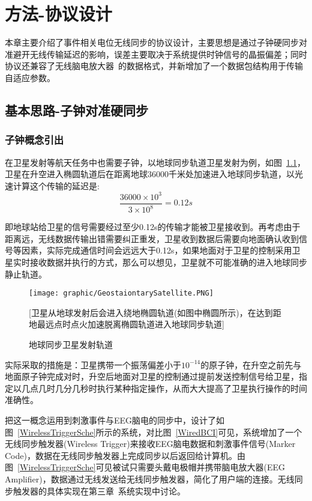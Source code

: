 \chapter{方法-协议设计\label{chp:protocol}}
本章主要介绍了事件相关电位无线同步的协议设计，主要思想是通过子钟硬同步对准避开无线传输延迟的影响，误差主要取决于系统提供时钟信号的晶振偏差；同时协议还兼容了无线脑电放大器~\cite{Xu2009}的数据格式，并新增加了一个数据包结构用于传输自适应参数。
\section{基本思路-子钟对准硬同步}
\subsection{子钟概念引出}
在卫星发射等航天任务中也需要子钟，以地球同步轨道卫星发射为例，如图~\ref{GeostationarySate}，卫星在升空进入椭圆轨道后在距离地球36000千米处加速进入地球同步轨道，以光速计算这个传输的延迟是:
\begin{equation}
\frac{36000 \times 10^{3}}{3 \times 10^{8}} = 0.12 s  
\end{equation}

即地球站给卫星的信号需要经过至少0.12s的传输才能被卫星接收到。再考虑由于距离远，无线数据传输出错需要纠正重发，卫星收到数据后需要向地面确认收到信号等因素，实际完成通信时间会远远大于0.12s，如果地面对于卫星的控制采用卫星实时接收数据并执行的方式，那么可以想见，卫星就不可能准确的进入地球同步静止轨道。

\begin{figure}[!hbp]
\begin{center}
\texttt{[image: graphic/GeostaiontarySatellite.PNG]}
\caption{ 地球同步卫星发射轨道 \label{GeostationarySate}}
[卫星从地球发射后会进入绕地椭圆轨道(如图中椭圆所示)，在达到距地最远点时点火加速脱离椭圆轨道进入地球同步轨道]
\end{center}
\end{figure}

实际采取的措施是：卫星携带一个振荡偏差小于$10^{-14}$的原子钟，在升空之前先与地面原子钟完成对时，升空后地面对卫星的控制通过提前发送控制信号给卫星，指定以几点几时几分几秒时执行某种指定操作，从而大大提高了卫星执行操作的时间准确性。

把这一概念运用到刺激事件与EEG脑电的同步中，设计了如图~\ref{WirelessTriggerSche}所示的系统，对比图~\ref{WiredBCI}可见，系统增加了一个无线同步触发器(Wireless Trigger)来接收EEG脑电数据和刺激事件信号(Marker Code)，数据在无线同步触发器上完成同步以后返回给计算机。由图~\ref{WirelessTriggerSche}可见被试只需要头戴电极帽并携带脑电放大器(EEG Amplifier)，数据通过无线发送给无线同步触发器，简化了用户端的连接。无线同步触发器的具体实现在\quad 第三章~系统实现\quad 中讨论。

